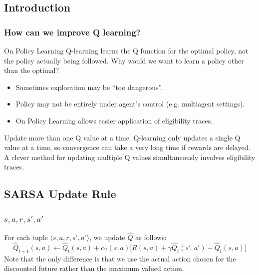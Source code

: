 \documentclass[ignorenonframetext]{beamer}
\begin{document}
\subsection{Introduction}
\begin{frame}[allowframebreaks]
	\frametitle{How can we improve Q learning?}
	\begin{block}{On Policy Learning}
		Q-learning learns the Q function for the optimal policy, not the
		policy actually being followed.  Why would we want to learn a
		policy other than the optimal?
		\begin{itemize}
			\item Sometimes exploration may be ``too dangerous''.
			\item Policy may not be entirely under agent's control (e.g.
				multiagent settings).
			\item On Policy Learning allows easier application of
				eligibility traces.
		\end{itemize}
	\end{block}
	\begin{block}{Update more than one Q value at a time.}
		Q-learning only updates a single Q value at a time, so convergence
		can take a very long time if rewards are delayed.  A clever
		method for updating multiple Q values simultaneously involves
		eligibility traces.
	\end{block}
\end{frame}

\subsection{SARSA Update Rule}
\begin{frame}
	\frametitle{$s,a,r,s',a'$}
	For each tuple $\langle s,a,r,s',a' \rangle$, we update $\hat{Q}$
	as follows:
	\[
	\hat{Q}_{t+1}(s,a) \leftarrow \hat{Q}_t(s,a) + \alpha_t(s,a)\big[ R(s,a) + \gamma 
	\hat{Q}_t(s',a') - \hat{Q}_t(s,a) \big]
	\]
	Note that the only difference is that we use the actual action
	chosen for the discounted future rather than the maximum valued
	action.
\end{frame}
\end{document}
